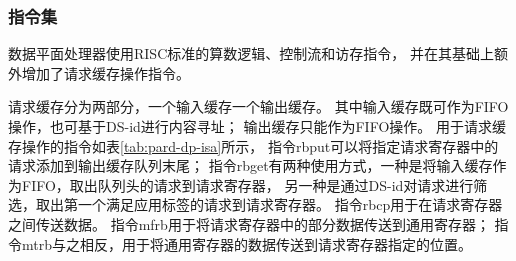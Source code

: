 \subsubsection{指令集}
\label{chap:hwresman:dp:isa}

数据平面处理器使用RISC标准的算数逻辑、控制流和访存指令，
并在其基础上额外增加了请求缓存操作指令。

请求缓存分为两部分，一个输入缓存一个输出缓存。
其中输入缓存既可作为FIFO操作，也可基于DS-id进行内容寻址；
输出缓存只能作为FIFO操作。
用于请求缓存操作的指令如表\ref{tab:pard-dp-isa}所示，
指令rbput可以将指定请求寄存器中的请求添加到输出缓存队列末尾；
指令rbget有两种使用方式，一种是将输入缓存作为FIFO，取出队列头的请求到请求寄存器，
另一种是通过DS-id对请求进行筛选，取出第一个满足应用标签的请求到请求寄存器。
指令rbcp用于在请求寄存器之间传送数据。
指令mfrb用于将请求寄存器中的部分数据传送到通用寄存器；
指令mtrb与之相反，用于将通用寄存器的数据传送到请求寄存器指定的位置。

